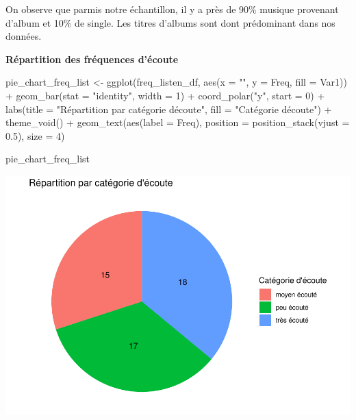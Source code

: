 \documentclass[
]{article}
\newenvironment{Shaded}{\begin{snugshade}}{\end{snugshade}}
\newcommand{\AttributeTok}[1]{\textcolor[rgb]{0.77,0.63,0.00}{#1}}
\newcommand{\DecValTok}[1]{\textcolor[rgb]{0.00,0.00,0.81}{#1}}
\newcommand{\FloatTok}[1]{\textcolor[rgb]{0.00,0.00,0.81}{#1}}
\newcommand{\FunctionTok}[1]{\textcolor[rgb]{0.00,0.00,0.00}{#1}}
\newcommand{\NormalTok}[1]{#1}
\newcommand{\OtherTok}[1]{\textcolor[rgb]{0.56,0.35,0.01}{#1}}
\newcommand{\SpecialCharTok}[1]{\textcolor[rgb]{0.00,0.00,0.00}{#1}}
\newcommand{\StringTok}[1]{\textcolor[rgb]{0.31,0.60,0.02}{#1}}
\begin{document}
On observe que parmis notre échantillon, il y a près de 90\% musique
provenant d'album et 10\% de single. Les titres d'albums sont dont
prédominant dans nos données.

\textbf{Répartition des fréquences d'écoute}

\begin{Shaded}
\begin{Highlighting}[]
\NormalTok{pie\_chart\_freq\_list }\OtherTok{\textless{}{-}} \FunctionTok{ggplot}\NormalTok{(freq\_listen\_df, }\FunctionTok{aes}\NormalTok{(}\AttributeTok{x =} \StringTok{""}\NormalTok{, }\AttributeTok{y =}\NormalTok{ Freq, }\AttributeTok{fill =}\NormalTok{ Var1)) }\SpecialCharTok{+}
  \FunctionTok{geom\_bar}\NormalTok{(}\AttributeTok{stat =} \StringTok{"identity"}\NormalTok{, }\AttributeTok{width =} \DecValTok{1}\NormalTok{) }\SpecialCharTok{+}
  \FunctionTok{coord\_polar}\NormalTok{(}\StringTok{"y"}\NormalTok{, }\AttributeTok{start =} \DecValTok{0}\NormalTok{) }\SpecialCharTok{+}
  \FunctionTok{labs}\NormalTok{(}\AttributeTok{title =} \StringTok{"Répartition par catégorie d\textquotesingle{}écoute"}\NormalTok{, }\AttributeTok{fill =} \StringTok{"Catégorie d\textquotesingle{}écoute"}\NormalTok{) }\SpecialCharTok{+}
  \FunctionTok{theme\_void}\NormalTok{() }\SpecialCharTok{+}
  \FunctionTok{geom\_text}\NormalTok{(}\FunctionTok{aes}\NormalTok{(}\AttributeTok{label =}\NormalTok{ Freq), }\AttributeTok{position =} \FunctionTok{position\_stack}\NormalTok{(}\AttributeTok{vjust =} \FloatTok{0.5}\NormalTok{), }\AttributeTok{size =} \DecValTok{4}\NormalTok{)}

\NormalTok{pie\_chart\_freq\_list}
\end{Highlighting}
\end{Shaded}

\includegraphics{spotify_analysis_files/figure-latex/unnamed-chunk-4-1.pdf}
\end{document}
